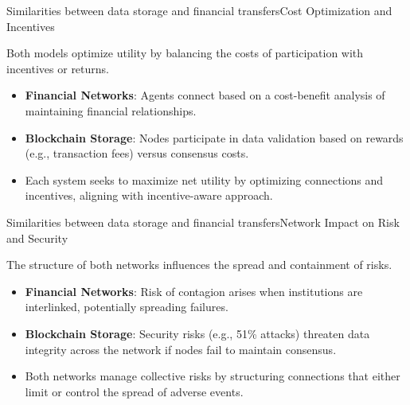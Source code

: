 \documentclass[aspectratio=169]{beamer}
\begin{document}
    \begin{frame}{Similarities between data storage and financial transfers}{Cost Optimization and Incentives}
        
    Both models optimize utility by balancing the costs of participation with incentives or returns.
    \vspace{3mm}
    
    \begin{itemize}
         \item \textbf{Financial Networks}: Agents connect based on a cost-benefit analysis of maintaining financial relationships.
         \item \textbf{Blockchain Storage}: Nodes participate in data validation based on rewards (e.g., transaction fees) versus consensus costs.
        \item Each system seeks to maximize net utility by optimizing connections and incentives, aligning with \cite{jalan_incentive-aware_2024} incentive-aware approach.
    \end{itemize}
    \end{frame}
    
    \begin{frame}{Similarities between data storage and financial transfers}{Network Impact on Risk and Security}

    
    The structure of both networks influences the spread and containment of risks.
    \vspace{3mm}
    
    \begin{itemize}
        \item \textbf{Financial Networks}: Risk of contagion arises when institutions are interlinked, potentially spreading failures.
        \item \textbf{Blockchain Storage}: Security risks (e.g., 51\% attacks) threaten data integrity across the network if nodes fail to maintain consensus.
        \item Both networks manage collective risks by structuring connections that either limit or control the spread of adverse events.
    \end{itemize}
    \end{frame}
    
\end{document}

